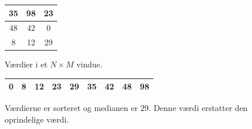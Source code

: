 {\begin{figure}[!h]
    \renewcommand{\arraystretch}{1.8}
    \centering
    \begin{tabular}{|c|c|c|}
        \hline
     35 & 98  & 23 \\\hline
     48 & \cellcolor[gray]{0.5}42 & 0 \\\hline
     8  & 12   & 29 \\\hline
    \end{tabular}
    \caption[]{Værdier i et $N\times{}M$ vindue.}
    \label{median_kernel}
\end{figure}

\begin{figure}[!h]
    \renewcommand{\arraystretch}{1.5}
    \centering
    \begin{tabular}{|c|c|c|c|c|c|c|c|c|}
        \hline
     0 & 8 & 12 & 23 & \cellcolor[gray]{0.5}29 & 35 & 42 & 48 & 98\\\hline
    \end{tabular}
    \caption[]{Værdierne er sorteret og medianen er 29. Denne værdi
    erstatter den oprindelige værdi.}
    \label{median_array}
\end{figure}

}
